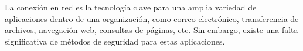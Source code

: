

La conexión en red es la tecnología clave para una amplia variedad 
de aplicaciones dentro de una organización, como correo electrónico, 
transferencia de archivos, navegación web, consultas de páginas, etc.
Sin embargo, existe una falta significativa de métodos de seguridad 
para estas aplicaciones.

    







